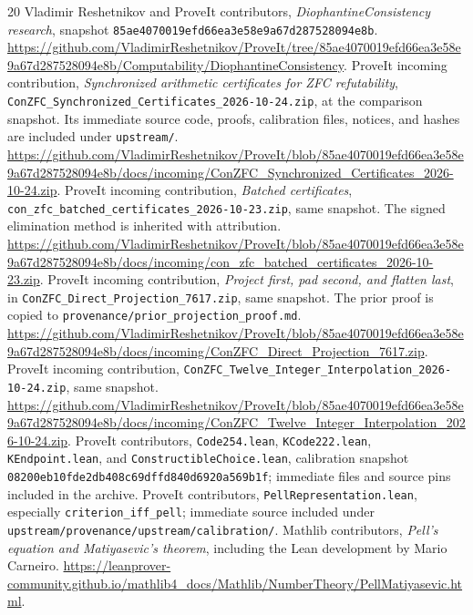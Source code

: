 \documentclass[10pt,letterpaper]{article}
\theoremstyle{definition}\newtheorem{definition}[theorem]{Definition}
\theoremstyle{remark}\newtheorem{remark}[theorem]{Remark}
\newcommand{\file}[1]{\texttt{\nolinkurl{#1}}}
\begin{document}
\begin{thebibliography}{20}
 Vladimir Reshetnikov and ProveIt contributors,
\emph{DiophantineConsistency research}, snapshot
\file{85ae4070019efd66ea3e58e9a67d287528094e8b}.
\url{https://github.com/VladimirReshetnikov/ProveIt/tree/85ae4070019efd66ea3e58e9a67d287528094e8b/Computability/DiophantineConsistency}.
 ProveIt incoming contribution,
\emph{Synchronized arithmetic certificates for ZFC refutability},
\file{ConZFC_Synchronized_Certificates_2026-10-24.zip}, at the comparison
snapshot. Its immediate source code, proofs, calibration files, notices,
and hashes are included under \file{upstream/}.
\url{https://github.com/VladimirReshetnikov/ProveIt/blob/85ae4070019efd66ea3e58e9a67d287528094e8b/docs/incoming/ConZFC_Synchronized_Certificates_2026-10-24.zip}.
 ProveIt incoming contribution,
\emph{Batched certificates},
\file{con_zfc_batched_certificates_2026-10-23.zip}, same snapshot.
The signed elimination method is inherited with attribution.
\url{https://github.com/VladimirReshetnikov/ProveIt/blob/85ae4070019efd66ea3e58e9a67d287528094e8b/docs/incoming/con_zfc_batched_certificates_2026-10-23.zip}.
 ProveIt incoming contribution,
\emph{Project first, pad second, and flatten last}, in
\file{ConZFC_Direct_Projection_7617.zip}, same snapshot. The prior proof
is copied to \file{provenance/prior_projection_proof.md}.
\url{https://github.com/VladimirReshetnikov/ProveIt/blob/85ae4070019efd66ea3e58e9a67d287528094e8b/docs/incoming/ConZFC_Direct_Projection_7617.zip}.
 ProveIt incoming contribution,
\file{ConZFC_Twelve_Integer_Interpolation_2026-10-24.zip}, same snapshot.
\url{https://github.com/VladimirReshetnikov/ProveIt/blob/85ae4070019efd66ea3e58e9a67d287528094e8b/docs/incoming/ConZFC_Twelve_Integer_Interpolation_2026-10-24.zip}.
 ProveIt contributors,
\file{Code254.lean}, \file{KCode222.lean}, \file{KEndpoint.lean}, and
\file{ConstructibleChoice.lean}, calibration snapshot
\file{08200eb10fde2db408c69dffd840d6920a569b1f}; immediate files and source
pins included in the archive.
 ProveIt contributors,
\file{PellRepresentation.lean}, especially
\file{criterion_iff_pell}; immediate source included under
\file{upstream/provenance/upstream/calibration/}.
 Mathlib contributors, \emph{Pell's equation and
Matiyasevic's theorem}, including the Lean development by Mario Carneiro.
\url{https://leanprover-community.github.io/mathlib4_docs/Mathlib/NumberTheory/PellMatiyasevic.html}.
\end{thebibliography}
\end{document}
